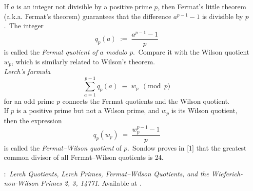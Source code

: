 \documentclass[12pt]{article}
\theoremstyle{definition}
\begin{document}

If $a$ is an integer not divisible by a positive prime $p$, then Fermat's little theorem (a.k.a. Fermat's theorem) guarantees that the difference $a^{p-1}\!-\!1$ is divisible by $p$.\, The integer
$$q_p(a) \;:=\; \frac{a^{p-1}\!-\!1}{p}$$
is called the {\it Fermat quotient of $a$ modulo $p$}.\, Compare it with the Wilson quotient $w_p$, which is similarly related to Wilson's theorem.\\

{\it Lerch's formula}
$$\sum_{a=1}^{p-1}q_p(a) \;\equiv\; w_p \;\, \pmod p$$
for an odd prime $p$ connects the Fermat quotients and the Wilson quotient.\\


If $p$ is a positive prime but not a Wilson prime, and $w_p$ is its Wilson quotient, then the expression
$$q_p(w_p) \;=\; \frac{w_p^{p-1}\!-\!1}{p}$$
is called the {\it Fermat--Wilson quotient} of $p$.\, Sondow proves in [1] that the greatest common divisor of all Fermat--Wilson quotients is 24.


\begin{thebibliography}{8}
:\, \emph{Lerch Quotients, Lerch Primes,
Fermat--Wilson Quotients, and the Wieferich-non-Wilson Primes 2, 3, 14771}. Available at .
\end{thebibliography}

\end{document}
